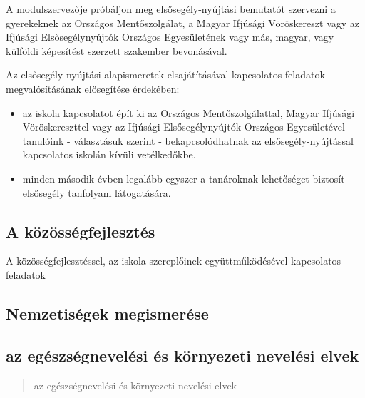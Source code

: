 A modulszervezője próbáljon meg elsősegély-nyújtási bemutatót szervezni a
gyerekeknek az Országos Mentőszolgálat, a Magyar Ifjúsági Vöröskereszt vagy az
Ifjúsági Elsősegélynyújtók Országos Egyesületének vagy más, magyar, vagy
külföldi képesítést szerzett szakember bevonásával.

Az elsősegély-nyújtási alapismeretek elsajátításával kapcsolatos feladatok
megvalósításának elősegítése érdekében:
\begin{itemize}
      \item az iskola kapcsolatot épít ki az Országos Mentőszolgálattal, Magyar
            Ifjúsági
            Vöröskereszttel vagy az Ifjúsági Elsősegélynyújtók Országos
            Egyesületével
            tanulóink - választásuk szerint - bekapcsolódhatnak az
            elsősegély-nyújtással
            kapcsolatos iskolán kívüli vetélkedőkbe.
      \item  minden második évben legalább egyszer a tanároknak lehetőséget
            biztosít
            elsősegély tanfolyam látogatására.

\end{itemize}

\subsection{A
      közösségfejlesztés}

A közösségfejlesztéssel, az iskola szereplőinek együttműködésével
kapcsolatos feladatok


\subsection{Nemzetiségek
      megismerése}\label{nemzetisuxe9gek-megismeruxe9se}


\subsection{az egészségnevelési és környezeti nevelési elvek}

\begin{quote}
      az egészségnevelési és környezeti nevelési elvek
\end{quote}
